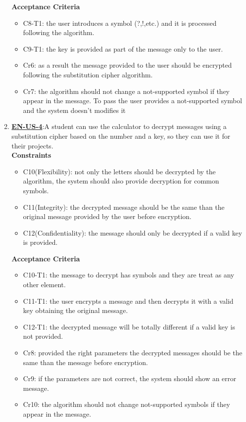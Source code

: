 \documentclass{report}
\begin{document}
\begin{enumerate}
\textbf{Acceptance Criteria}
\begin{itemize}
    \item C8-T1: the user introduces a symbol (?,!,etc.) and it is processed following the algorithm.
    \item C9-T1: the key is provided as part of the message only to the user.

    \item Cr6: as a result the message provided to the user should be encrypted following the substitution cipher algorithm.
    \item Cr7: the algorithm should not change a not-supported symbol if they appear in the message. To pass the user provides a not-supported symbol and the system doesn't modifies it \newline
\end{itemize}

\item \underline{\textbf{EN-US-4}}:A student can use the calculator to decrypt messages using a substitution cipher based on the number and a key, so they can use it for their projects. \\ \newline
\textbf{Constraints}
\begin{itemize}
    \item C10(Flexibility): not only the letters should be decrypted by the algorithm, the system should also provide decryption for common symbols. 
    \item C11(Integrity): the decrypted message should be the same than the original message provided by the user before encryption.
    \item C12(Confidentiality): the message should only be decrypted if a valid key is provided.
\end{itemize}

\textbf{Acceptance Criteria}
\begin{itemize}
    \item C10-T1: the message to decrypt has symbols and they are treat as any other element.
    \item C11-T1: the user encrypts a message and then decrypts it with a valid key obtaining the original message.
    \item C12-T1: the decrypted message will be totally different if a valid key is not provided.

    \item Cr8: provided the right parameters the decrypted messages should be the same than the message before encryption.
    \item Cr9: if the parameters are not correct, the system should show an error message.
    \item Cr10: the algorithm should not change not-supported symbols if they appear in the message.\newline
\end{itemize}


\end{enumerate}
\end{document}
